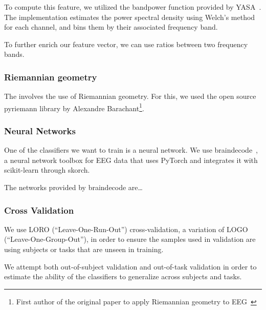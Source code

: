             To compute this feature, we utilized the bandpower function provided by YASA~\cite{raphael_vallat_raphaelvallatyasa_2020}. The implementation estimates the power spectral density using Welch's method for each channel, and bins them by their associated frequency band.

            To further enrich our feature vector, we can use ratios between two frequency bands.

        \subsubsection{Riemannian geometry}

            The  involves the use of Riemannian geometry. For this, we used the open source pyriemann library by Alexandre Barachant\footnote{First author of the original paper to apply Riemannian geometry to EEG~\cite{barachant_classification_2013}}.

    \subsubsection{Neural Networks}

        One of the classifiers we want to train is a neural network. We use braindecode~\cite{schirrmeister_deep_2017}\cite{noauthor_braindecodebraindecode_2021}, a neural network toolbox for EEG data that uses PyTorch and integrates it with scikit-learn through skorch.

        The networks provided by braindecode are\ldots

    \subsubsection{Cross Validation}

        We use LORO (``Leave-One-Run-Out'') cross-validation, a variation of LOGO (``Leave-One-Group-Out''), in order to ensure the samples used in validation are using subjects or tasks that are unseen in training.

        We attempt both out-of-subject validation and out-of-task validation in order to estimate the ability of the classifiers to generalize across subjects and tasks.
